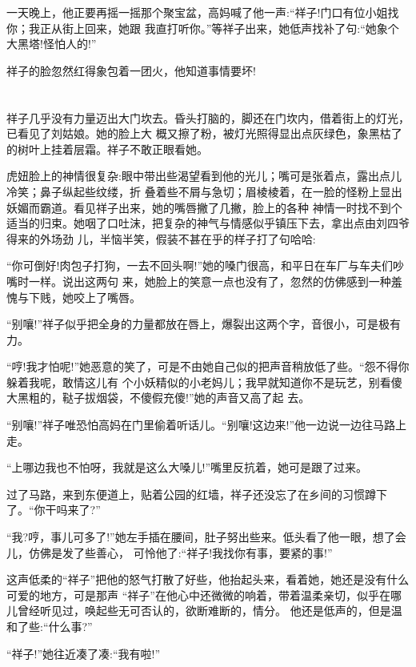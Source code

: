 \documentclass[11pt,a4paper,onecolumn]{article}
\begin{document}
一天晚上，他正要再摇一摇那个聚宝盆，高妈喊了他一声:``祥子!门口有位小姐找你；我正从街上回来，她跟
我直打听你。''等祥子出来，她低声找补了句:``她象个大黑塔!怪怕人的!''

祥子的脸忽然红得象包着一团火，他知道事情要坏!

\pagebreak
\section{}

祥子几乎没有力量迈出大门坎去。昏头打脑的，脚还在门坎内，借着街上的灯光，已看见了刘姑娘。她的脸上大
概又擦了粉，被灯光照得显出点灰绿色，象黑枯了的树叶上挂着层霜。祥子不敢正眼看她。

虎妞脸上的神情很复杂:眼中带出些渴望看到他的光儿；嘴可是张着点，露出点儿冷笑；鼻子纵起些纹缕，折
叠着些不屑与急切；眉棱棱着，在一脸的怪粉上显出妖媚而霸道。看见祥子出来，她的嘴唇撇了几撇，脸上的各种
神情一时找不到个适当的归束。她咽了口吐沫，把复杂的神气与情感似乎镇压下去，拿出点由刘四爷得来的外场劲
儿，半恼半笑，假装不甚在乎的样子打了句哈哈:

``你可倒好!肉包子打狗，一去不回头啊!''她的嗓门很高，和平日在车厂与车夫们吵嘴时一样。说出这两句
来，她脸上的笑意一点也没有了，忽然的仿佛感到一种羞愧与下贱，她咬上了嘴唇。

``别嚷!''祥子似乎把全身的力量都放在唇上，爆裂出这两个字，音很小，可是极有力。

``哼!我才怕呢!''她恶意的笑了，可是不由她自己似的把声音稍放低了些。``怨不得你躲着我呢，敢情这儿有
个小妖精似的小老妈儿；我早就知道你不是玩艺，别看傻大黑粗的，鞑子拔烟袋，不傻假充傻!''她的声音又高了起
去。

``别嚷!''祥子唯恐怕高妈在门里偷着听话儿。``别嚷!这边来!''他一边说一边往马路上走。

``上哪边我也不怕呀，我就是这么大嗓儿!''嘴里反抗着，她可是跟了过来。

过了马路，来到东便道上，贴着公园的红墙，祥子\myrule 还没忘了在乡间的习惯\myrule 蹲下了。``你干吗来了?''

``我?哼，事儿可多了!''她左手插在腰间，肚子努出些来。低头看了他一眼，想了会儿，仿佛是发了些善心，
可怜他了:``祥子!我找你有事，要紧的事!''

这声低柔的``祥子''把他的怒气打散了好些，他抬起头来，看着她，她还是没有什么可爱的地方，可是那声
``祥子''在他心中还微微的响着，带着温柔亲切，似乎在哪儿曾经听见过，唤起些无可否认的，欲断难断的，情分。
他还是低声的，但是温和了些:``什么事?''

``祥子!''她往近凑了凑:``我有啦!''
\end{document}
